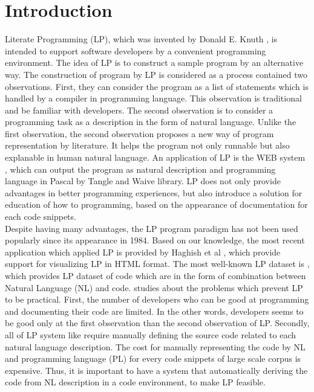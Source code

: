 \documentclass[sigconf,review,anonymous]{article}
\begin{document}
\section{Introduction}
Literate Programming (LP), which was invented by Donald E. Knuth \cite{001}, is intended to support software developers by a convenient programming environment. The idea of LP is to construct a sample program by an alternative way. The construction of program by LP is considered as a process contained two observations. First, they can consider the program as a list of statements which is handled by a compiler in programming language. This observation is traditional and be familiar with developers. The second observation is to consider a programming task as a description in the form of natural language. Unlike the first observation, the second observation proposes a new way of program representation by literature. It helps the program not only runnable but also explanable in human natural language. An application of LP is the WEB system \cite{001}, which can output the program as natural description and programming language in Pascal by Tangle and Waive library. LP does not only provide advantages in better programming experiences, but also introduce a solution for education of how to programming, based on the appearance of documentation for each code snippets.
\\
Despite having many advantages, the LP program paradigm has not been used popularly since its appearance in 1984. Based on our knowledge, the most recent application which applied LP is provided by  Haghish et al \cite{005}, which provide support for visualizing LP in HTML format. The most well-known LP dataset is \cite{006}, which provides LP dataset of code which are in the form of combination between Natural Language (NL) and code. \cite{004} studies about the problems which 
prevent LP to be practical. First, the number of developers who can be good at programming and documenting their code are limited. In the other words, developers seems to be good only at the first observation than the second observation of LP. Secondly, all of LP system like \cite{006} require manually defining the source code related to each natural language description. The cost for manually representing the code by NL and programming language (PL) for every code snippets of large scale corpus is expensive. Thus, it is important to have a system that automatically deriving the code from NL description in a code environment, to make LP feasible.
\\
\end{document}
